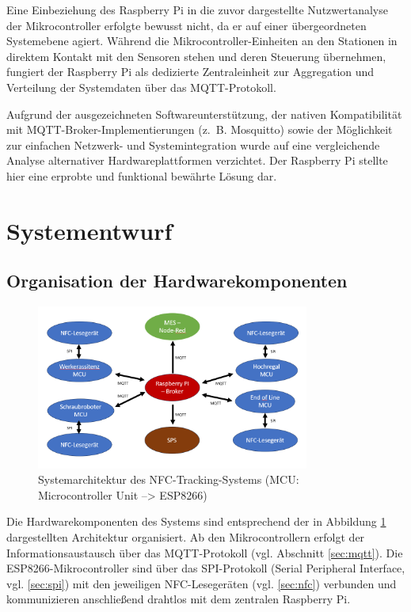 Eine Einbeziehung des Raspberry Pi in die zuvor dargestellte Nutzwertanalyse der Mikrocontroller erfolgte bewusst nicht, da er auf einer übergeordneten Systemebene agiert. Während die Mikrocontroller-Einheiten an den Stationen in direktem Kontakt mit den Sensoren stehen und deren Steuerung übernehmen, fungiert der Raspberry Pi als dedizierte Zentraleinheit zur Aggregation und Verteilung der Systemdaten über das MQTT-Protokoll.

Aufgrund der ausgezeichneten Softwareunterstützung, der nativen Kompatibilität mit MQTT-Broker-Implementierungen (z.~B. Mosquitto) sowie der Möglichkeit zur einfachen Netzwerk- und Systemintegration wurde auf eine vergleichende Analyse alternativer Hardwareplattformen verzichtet. Der Raspberry Pi stellte hier eine erprobte und funktional bewährte Lösung dar.

\section{Systementwurf}
\label{sec:systementwurf}

\subsection{Organisation der Hardwarekomponenten}
\begin{figure}[H] %
	\centering
	\includegraphics[width=0.8\textwidth]{images/Systemarchitektur.png}
	\caption{Systemarchitektur des NFC-Tracking-Systems (MCU: Microcontroller Unit --> ESP8266)}
	\label{fig:systemarchitektur}
\end{figure}

Die Hardwarekomponenten des Systems sind entsprechend der in Abbildung \ref{fig:systemarchitektur} dargestellten Architektur organisiert. Ab den Mikrocontrollern erfolgt der Informationsaustausch über das MQTT-Protokoll (vgl. Abschnitt \autoref{sec:mqtt}). Die ESP8266-Mikrocontroller sind über das SPI-Protokoll (Serial Peripheral Interface, vgl. \autoref{sec:spi}) mit den jeweiligen NFC-Lesegeräten (vgl. \autoref{sec:nfc}) verbunden und kommunizieren anschließend drahtlos mit dem zentralen Raspberry Pi.

